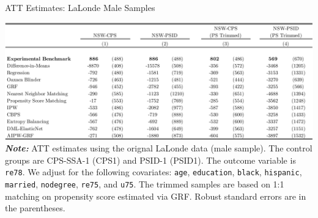 \documentclass[letterpaper,12pt,leqno]{article}
\begin{document}
\begin{table}[!ht]
\caption{ATT Estimates: LaLonde Male Samples}\label{tb:nsw.est}
\begin{minipage}[c]{1\textwidth}
\vspace{-0.5em}\includegraphics[width=\linewidth]{nsw.pdf}
{\footnotesize\textbf{\textit{Note:}} ATT estimates using the orignal LaLonde data (male sample). The control groups are CPS-SSA-1 (CPS1) and PSID-1 (PSID1). The outcome variable is \texttt{re78}. We adjust for the following covariates: \texttt{age}, \texttt{education}, \texttt{black}, \texttt{hispanic}, \texttt{married}, \texttt{nodegree}, \texttt{re75}, and \texttt{u75}. The trimmed samples are based on 1:1 matching on propensity score estimated via GRF. Robust standard errors are in the parentheses.}
\end{minipage}%
\end{table}

\clearpage
\end{document}
